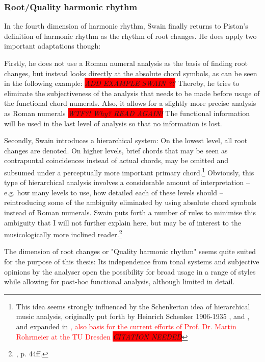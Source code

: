 \documentclass[a4paper,12pt]{report}
\begin{document}
\subsubsection{Root/Quality harmonic rhythm}
In the fourth dimension of harmonic rhythm, Swain finally returns to Piston's definition of harmonic rhythm as the rhythm of root changes. He does apply two important adaptations though:

Firstly, he does not use a Roman numeral analysis as the basis of finding root changes, but instead looks directly at the absolute chord symbols, as can be seen in the following example: \emph{\colorbox{red}{ADD EXAMPLE SWAIN ??}} Thereby, he tries to eliminate the subjectiveness of the analysis that needs to be made before usage of the functional chord numerals. Also, it allows for a slightly more precise analysis as Roman numerals \emph{\colorbox{red}{WTF?! Why? READ AGAIN!}} The functional information will be used in the last level of analysis so that no information is lost.

Secondly, Swain introduces a hierarchical system: On the lowest level, all root changes are denoted. On higher levels, brief chords that may be seen as contrapuntal coincidences instead of actual chords, may be omitted and subsumed under a perceptually more important primary chord.\footnote{This idea seems strongly influenced by the Schenkerian idea of hierarchical music analysis, originally put forth by Heinrich Schenker 1906-1935 \cite{schenker1906harmonielehre}, \cite{schenker1991neue} and \cite{schenker1956freie}, and expanded in \cite{jackendoff1983generative}\textcolor{red}{, also basis for the current efforts of Prof. Dr. Martin Rohrmeier at the TU Dresden} \emph{\colorbox{red}{CITATION NEEDED}}} Obviously, this type of hierarchical analysis involves a considerable amount of interpretation -- e.g. how many levels to use, how detailed each of these levels should -- reintroducing some of the ambiguity eliminated by using absolute chord symbols instead of Roman numerals. Swain puts forth a number of rules to minimise this ambiguity that I will not further explain here, but may be of interest to the musicologically more inclined reader.\footnote{\cite{swain2002harmonic}, p. 44ff.}

The dimension of root changes or "Quality harmonic rhythm" seems quite suited for the purpose of this thesis: Its independence from tonal systems and subjective opinions by the analyser open the possibility for broad usage in a range of styles while allowing for post-hoc functional analysis, although limited in detail.
\end{document}
